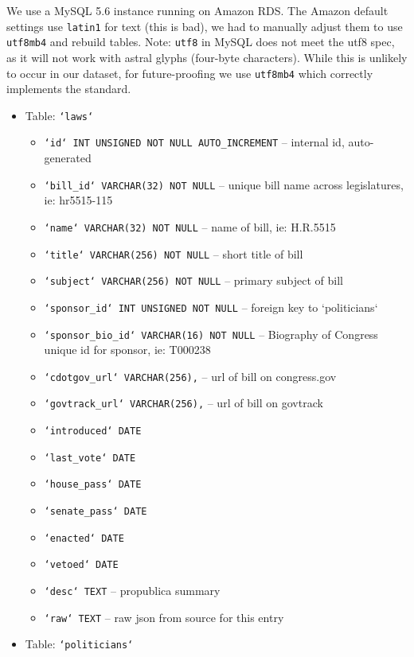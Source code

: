 \documentclass[12pt]{article}
\newcommand{\code}[1]{\texttt{#1}}
\begin{document}
We use a MySQL 5.6 instance running on Amazon RDS. The Amazon default settings use \code{latin1} for text (this is bad), we had to manually adjust them to use \code{utf8mb4} and rebuild tables. Note: \code{utf8} in MySQL does not meet the utf8 spec, as it will not work with astral glyphs (four-byte characters). While this is unlikely to occur in our dataset, for future-proofing we use \code{utf8mb4} which correctly implements the standard. 

\begin{itemize}
	\item[] Table: \code{`laws`}
	\begin{itemize}
		\item \code{`id` INT UNSIGNED NOT NULL AUTO\_INCREMENT}	-- internal id, auto-generated
		\item \code{`bill\_id` VARCHAR(32) NOT NULL}			-- unique bill name across legislatures, ie: hr5515-115
		\item \code{`name` VARCHAR(32) NOT NULL}				-- name of bill, ie: H.R.5515
		\item \code{`title` VARCHAR(256) NOT NULL}				-- short title of bill
		\item \code{`subject` VARCHAR(256) NOT NULL}			-- primary subject of bill
		\item \code{`sponsor\_id` INT UNSIGNED NOT NULL}		-- foreign key to `politicians`
		\item \code{`sponsor\_bio\_id` VARCHAR(16) NOT NULL}	-- Biography of Congress unique id for sponsor, ie: T000238
		\item \code{`cdotgov\_url` VARCHAR(256),}				-- url of bill on congress.gov
		\item \code{`govtrack\_url` VARCHAR(256),}				-- url of bill on govtrack
		\item \code{`introduced` DATE}
		\item \code{`last\_vote` DATE}
		\item \code{`house\_pass` DATE}
		\item \code{`senate\_pass` DATE}
		\item \code{`enacted` DATE}
		\item \code{`vetoed` DATE}
		\item \code{`desc` TEXT}								-- propublica summary
		\item \code{`raw` TEXT}									-- raw json from source for this entry
	\end{itemize}
	\item[] Table: \code{`politicians`}
	\begin{itemize}

\end{itemize}
\end{itemize}
\end{document}
